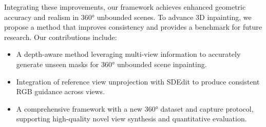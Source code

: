 Integrating these improvements, our framework achieves enhanced geometric accuracy and realism in 360° unbounded scenes. To advance 3D inpainting, we propose a method that improves consistency and provides a benchmark for future research. Our contributions include: 
\begin{itemize} 
\item A depth-aware method leveraging multi-view information to accurately generate unseen masks for 360° unbounded scene inpainting. 
\item Integration of reference view unprojection with SDEdit to produce consistent RGB guidance across views. 
\item A comprehensive framework with a new 360° dataset and capture protocol, supporting high-quality novel view synthesis and quantitative evaluation. 
\end{itemize}






